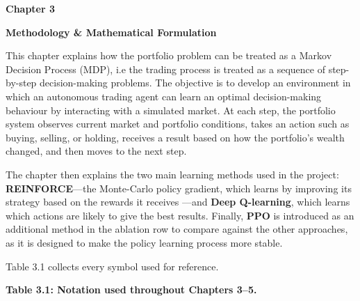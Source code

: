 \textbf{Chapter 3}

\textbf{Methodology \& Mathematical Formulation}

This chapter explains how the portfolio problem can be treated as a
Markov Decision Process (MDP), i.e the trading process is treated as a
sequence of step-by-step decision-making problems. The objective is to
develop an environment in which an autonomous trading agent can learn an
optimal decision-making behaviour by interacting with a simulated
market. At each step, the portfolio system observes current market and
portfolio conditions, takes an action such as buying, selling, or
holding, receives a result based on how the portfolio's wealth changed,
and then moves to the next step.

The chapter then explains the two main learning methods used in the
project: \textbf{REINFORCE}---the Monte-Carlo policy gradient, which
learns by improving its strategy based on the rewards it receives ---and
\textbf{Deep Q-learning}, which learns which actions are likely to give
the best results. Finally, \textbf{PPO} is introduced as an additional
method in the ablation row to compare against the other approaches, as
it is designed to make the policy learning process more stable.

Table 3.1 collects every symbol used for reference.

\textbf{Table 3.1: Notation used throughout Chapters 3--5.}

